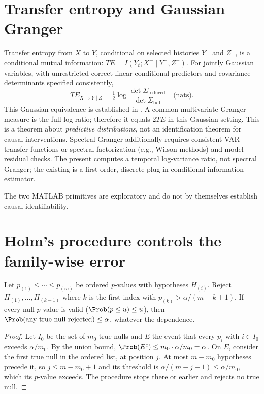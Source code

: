 \section{Transfer entropy and Gaussian Granger}
Transfer entropy from $X$ to $Y$, conditional on selected
histories $Y^-$ and $Z^-$, is a conditional mutual information:
$TE=I(Y_t;X^-\mid Y^-,Z^-)$.
For jointly Gaussian variables, with unrestricted correct
linear conditional predictors and covariance determinants
specified consistently,
\[
TE_{X\to Y\mid Z}=\tfrac12
\log\frac{\det\Sigma_{\mathrm{reduced}}}
                {\det\Sigma_{\mathrm{full}}}
\quad\text{(nats)}.
\]
This Gaussian equivalence is established in \cite{barnett2009}.
A common multivariate Granger measure is the full log ratio;
therefore it equals $2TE$ in this Gaussian setting.
This is a theorem about \emph{predictive distributions}, not an
identification theorem for causal interventions.
Spectral Granger additionally requires consistent VAR transfer
functions or spectral factorization (e.g., Wilson methods) and
model residual checks. The present
 computes a temporal
log-variance ratio, not spectral Granger; the existing
 is a first-order,
discrete plug-in conditional-information estimator.
\begin{caution}The two MATLAB primitives are exploratory and do not by themselves establish causal identifiability.\end{caution}
\section{Holm's procedure controls the family-wise error}
\begin{proposition}
Let $p_{(1)}\le\cdots\le p_{(m)}$ be ordered $p$-values with hypotheses
$H_{(i)}$. Reject $H_{(1)},\ldots,H_{(k-1)}$ where $k$ is the first index
with $p_{(k)}>\alpha/(m-k+1)$. If every null $p$-value is valid
($\Prob(p\le u)\le u$), then $\Prob(\text{any true null rejected})\le\alpha$,
whatever the dependence.
\end{proposition}
\begin{proof}
Let $I_0$ be the set of $m_0$ true nulls and $E$ the event that every
$p_i$ with $i\in I_0$ exceeds $\alpha/m_0$. By the union bound,
$\Prob(E^c)\le m_0\cdot\alpha/m_0=\alpha$. On $E$, consider the first true
null in the ordered list, at position $j$. At most $m-m_0$ hypotheses
precede it, so $j\le m-m_0+1$ and its threshold is
$\alpha/(m-j+1)\le\alpha/m_0$, which its $p$-value exceeds. The procedure
stops there or earlier and rejects no true null.
\end{proof}


